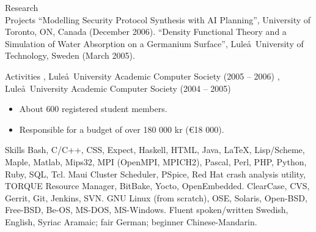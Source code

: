 \documentclass{../../cls/cv}
\begin{document}
\begin{category}{Research \\ Projects}
\citembullet ``Modelling Security Protocol Synthesis with AI Planning'', University of Toronto, ON, Canada (December 2006).
\citembullet ``Density Functional Theory and a Simulation of Water Absorption on a Germanium Surface'', Lule\aa\ University of Technology, Sweden (March 2005).
\end{category}

\begin{category}{Activities}
, Lule\aa \ University Academic Computer Society (2005 -- 2006)
, Lule\aa \ University Academic Computer Society (2004 -- 2005)
\begin{itemize}
\item About $600$ registered student members.
\item Responsible for a budget of over 180 000 kr (\euro18 000).
\end{itemize}
\end{category}

\begin{category}{Skills}
\citembullet Bash, C/C++, CSS, Expect, Haskell, HTML, Java, \LaTeX, Lisp/Scheme, Maple, Matlab,
Mips32, MPI (OpenMPI, MPICH2), Pascal, Perl, PHP, Python, Ruby, SQL, Tcl.
\citembullet Maui Cluster Scheduler, PSpice, Red Hat crash analysis utility, TORQUE Resource Manager, BitBake, Yocto, OpenEmbedded.
\citembullet ClearCase, CVS, Gerrit, Git, Jenkins, SVN.
\citembullet GNU Linux (from scratch), OSE, Solaris, Open-BSD, Free-BSD, Be-OS, MS-DOS, MS-Windows.
\citembullet Fluent spoken/written Swedish, English, Syriac Aramaic; fair German; beginner Chinese-Mandarin.
\end{category}

\end{document}
